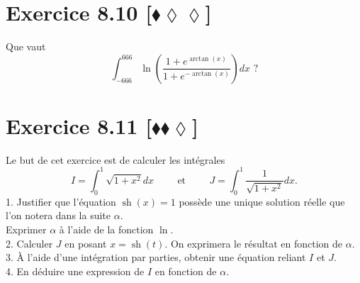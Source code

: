 \documentclass[10pt]{article}
\DeclareMathOperator{\sh}{sh}
\begin{document}

\section*{Exercice 8.10 [$\blacklozenge\lozenge\lozenge$]}
\begin{tcolorbox}[enhanced, width=7in, center, size=fbox, fontupper=\large, drop shadow southwest]
    Que vaut
    \begin{equation*}
        \int_{-666}^{666}{\ln\left(\frac{1+e^{\arctan(x)}}{1+e^{-\arctan(x)}}\right)dx} \text{ ?}
    \end{equation*}
\end{tcolorbox}


\section*{Exercice 8.11 [$\blacklozenge\blacklozenge\lozenge$]}
\begin{tcolorbox}[enhanced, width=7in, center, size=fbox, fontupper=\large, drop shadow southwest]
    Le but de cet exercice est de calculer les intégrales
    \begin{equation*}
        I = \int_0^1{\sqrt{1+x^2}dx} \hspace{1cm} \text{et} \hspace{1cm} J=\int_0^1{\frac{1}{\sqrt{1+x^2}}dx}.
    \end{equation*}
    1. Justifier que l'équation $\sh(x)=1$ possède une unique solution réelle que l'on notera dans la suite $\alpha$.\\
    Exprimer $\alpha$ à l'aide de la fonction $\ln$.\\
    2. Calculer $J$ en posant $x=\sh(t)$. On exprimera le résultat en fonction de $\alpha$.\\
    3. À l'aide d'une intégration par parties, obtenir une équation reliant $I$ et $J$.\\
    4. En déduire une expression de $I$ en fonction de $\alpha$.
\end{tcolorbox}

\end{document}
